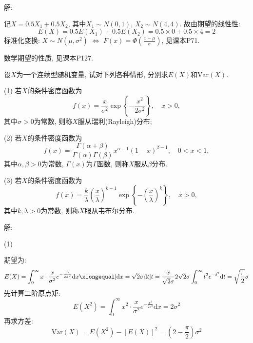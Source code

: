 \documentclass[standard]{ExBook}
\begin{document}
\begin{qitems}
\vspace{-5em}

    \begin{bbox}
解: 

记$X=0.5 X_{1}+0.5 X_{2}$, 其中$X_{1}\sim N(0,1)$, $X_{2}\sim N(4,4)$. 故由期望的线性性:
$$E(X)=0.5 E(X_{1})+0.5 E(X_{2})=0.5\times0+0.5\times4=2$$
\textcolor{themeColor}{\selectfont {}
标准化变换: $X\sim N(\mu,\sigma^2)$ $\Longleftrightarrow$ $F(x)=\Phi(\frac{x-\mu}{\sigma})$, 见课本P71.}

\textcolor{themeColor}{\selectfont {}
数学期望的性质, 见课本P127.}
    \end{bbox}

\vspace{-5em}

    \begin{bbox}
    \begin{shaded}
        \qitem
设$X$为一个连续型随机变量, 试对下列各种情形, 分别求$E ( X ) $和$\mathrm{Var}(X)$.

(1) 若$X$的条件密度函数为
$$f(x)=\displaystyle\frac{x}{\sigma^2}\exp\left\{-\frac{x^2}{2\sigma^2}\right\},\quad x>0,$$
其中$\sigma>0$为常数, 则称$X$服从瑞利(Rayleigh)分布;

(2) 若$X$的条件密度函数为
$$f(x)=\displaystyle\frac{\Gamma(\alpha+\beta)}{\Gamma(\alpha)\Gamma(\beta)}x^{\alpha-1}(1-x)^{\beta-1},\quad 0<x<1,$$
其中$\alpha,\beta>0$为常数, $\Gamma(x)$为$\Gamma$函数, 则称$X$服从$\beta$分布.

(3) 若$X$的条件密度函数为
$$f(x)=\displaystyle\frac{k}{\lambda}\left(\frac{x}{\lambda}\right)^{k-1}\exp \left\{-\left(\frac{x}{\lambda}\right)^{k}\right\},\quad x>0,$$
其中$k, \lambda>0$为常数, 则称$X$服从韦布尔分布.
    \end{shaded}
    \end{bbox}

\vspace{-5em}

    \begin{bbox}
解: 

(1)

期望为:
$$\displaystyle E(X)=\int_{0}^{\infty}x\cdot \frac{x}{\sigma^2}e^{-\frac{x^2}{2\sigma^2}}\mathrm{d}x\xlongequal[\mathrm{d}x=\sqrt{2}\sigma\mathrm{d}t]{t=\frac{x}{\sqrt{2}\sigma}}2\sqrt{2}\sigma\int_{0}^{\infty}t^2 e^{-t^2}\mathrm{d}t=\sqrt{\frac{\pi}{2}}\sigma$$
先计算二阶原点矩:
$$E(X^2)=\int_{0}^{\infty}x^2\cdot \frac{x}{\sigma^2}e^{-\frac{x^2}{2\sigma^2}}\mathrm{d}x=2\sigma^2$$
再求方差:
$$\mathrm{Var}(X)=E(X^2)-\left[E(X)\right]^2=\left(2-\frac{\pi}{2}\right)\sigma^2$$
    \end{bbox}


\end{qitems}
\end{document}
